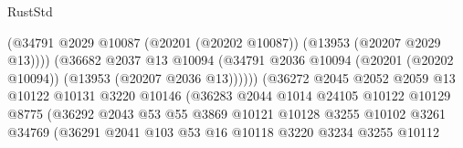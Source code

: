 \begin{lexlean}{RustStd}
\begin{coremodule}
                                            (@34791
                                              @2029
                                              @10087
                                              (@20201 (@20202 @10087))
                                              (@13953 (@20207 @2029 @13))))
                                          (@36682
                                            @2037
                                            @13
                                            @10094
                                            (@34791
                                              @2036
                                              @10094
                                              (@20201 (@20202 @10094))
                                              (@13953 (@20207 @2036 @13))))))
                                      (@36272
                                        @2045
                                        @2052
                                        @2059
                                        @13
                                        @10122
                                        @10131
                                        @3220
                                        @10146
                                        (@36283
                                          @2044
                                          @1014
                                          @24105
                                          @10122
                                          @10129
                                          @8775
                                          (@36292
                                            @2043
                                            @53
                                            @55
                                            @3869
                                            @10121
                                            @10128
                                            @3255
                                            @10102
                                            @3261
                                            @34769
                                            (@36291
                                              @2041
                                              @103
                                              @53
                                              @16
                                              @10118
                                              @3220
                                              @3234
                                              @3255
                                              @10112

\end{coremodule}
\end{lexlean}
